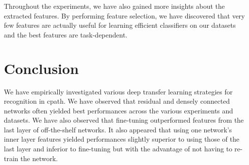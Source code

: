 Throughout the experiments, we have also gained more insights about the extracted features. By performing feature selection, we have discovered that very few features are actually useful for learning efficient classifiers on our datasets and the best features are task-dependent.


\section{Conclusion}
\label{sec:comp:conclusion}

We have empirically investigated various deep transfer learning strategies for recognition in \acrlong{cpath}. We have observed that residual and densely connected networks often yielded best performances across the various experiments and datasets. We have also observed that fine-tuning outperformed features from the last layer of off-the-shelf networks. It also appeared that using one network's inner layer features yielded performances slightly superior to using those of the last layer and inferior to fine-tuning but with the advantage of not having to re-train the network. 


